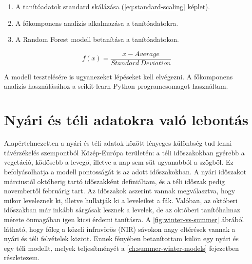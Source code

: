 \begin{enumerate}
	\item A tanítóadatok standard skálázása (\ref{eq:standard-scaling} képlet).
	\item A főkomponens analízis alkalmazása a tanítóadatokra.
	\item A Random Forest modell betanítása a tanítóadatokon.
\end{enumerate}

\begin{equation}\label{eq:standard-scaling}
  f(x) = \frac{x - Average}{Standard \ Deviation}
\end{equation}

A modell tesztelésére is ugyanezeket lépéseket kell elvégezni. A főkomponens analízis használásához a scikit-learn \cite{scikit-learn} Python programcsomagot használtam. 

\section{Nyári és téli adatokra való lebontás}

Alapértelmezetten a nyári és téli adatok között lényeges különbség tud lenni távérzékelés szempontból Közép-Európa területén: a téli időszakokban gyérebb a vegetáció, ködösebb a levegő, illetve a nap sem süt ugyanabból a szögből. Ez befolyásolhatja a modell pontosságát is az adott időszakokban. A nyári időszakot márciustól októberig tartó időszakként definiáltam, és a téli időszak pedig novembertől februárig tart. Az időszakok aszerint vannak megválasztva, hogy mikor leveleznek ki, illetve hullatják ki a leveleiket a fák. Valóban, az októberi időszakban már inkább sárgásak lesznek a levelek, de az októberi tanítóhalmaz mérete önmagában igen kicsi érdemi tanításra. A \ref{fig:winter-vs-summer} ábrából látható, hogy főleg a közeli infravörös (NIR) sávokon nagy eltérések vannak a nyári és téli felvételek között. Ennek fényében betanítottam külön egy nyári és egy téli modellt, melyek teljesítményét a \ref{ch:summer-winter-models}  fejezetben részletezem.


